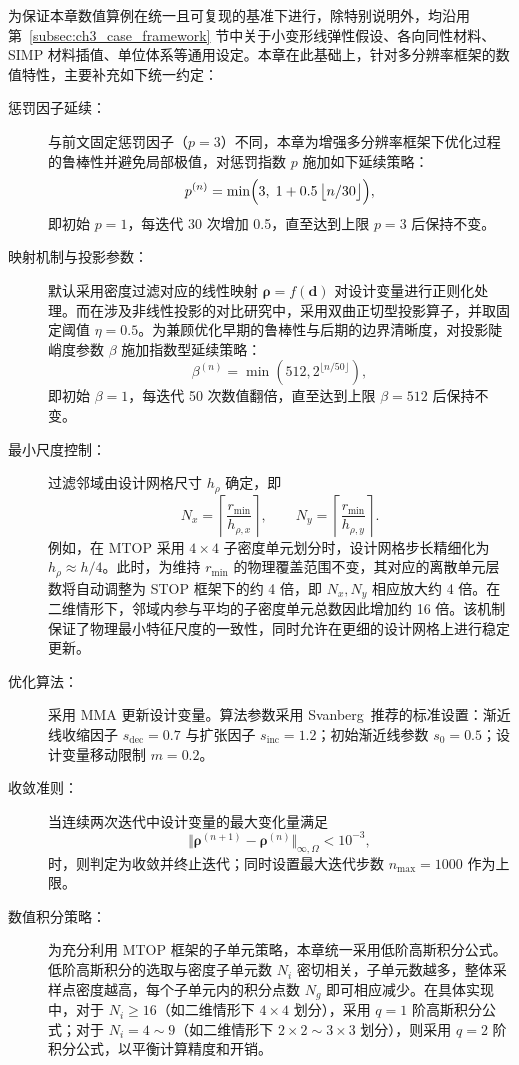 为保证本章数值算例在统一且可复现的基准下进行，除特别说明外，均沿用第~\ref{subsec:ch3_case_framework} 节中关于小变形线弹性假设、各向同性材料、SIMP 材料插值、单位体系等通用设定。本章在此基础上，针对多分辨率框架的数值特性，主要补充如下统一约定：
\begin{description}
	\item [惩罚因子延续：]与前文固定惩罚因子（$p=3$）不同，本章为增强多分辨率框架下优化过程的鲁棒性并避免局部极值，对惩罚指数 $p$ 施加如下延续策略：
	\[
	p^{(n)}=\min\Bigl(3,\; 1+0.5\,\bigl\lfloor n/30 \bigr\rfloor \Bigr),
	\]
	即初始 $p=1$，每迭代 30 次增加 0.5，直至达到上限 $p=3$ 后保持不变。
	
	\item [映射机制与投影参数：]默认采用密度过滤对应的线性映射 $\boldsymbol{\rho} = f(\boldsymbol{d})$ 对设计变量进行正则化处理。而在涉及非线性投影的对比研究中，采用双曲正切型投影算子，并取固定阈值 $\eta=0.5$。为兼顾优化早期的鲁棒性与后期的边界清晰度，对投影陡峭度参数 $\beta$ 施加指数型延续策略：
	\[
	\beta^{(n)} = \min\left(512, 2^{\lfloor n/50 \rfloor} \right),
	\]
	即初始 $\beta=1$，每迭代 50 次数值翻倍，直至达到上限 $\beta=512$ 后保持不变。
	
	\item [最小尺度控制：]过滤邻域由设计网格尺寸 $h_\rho$ 确定，即
	\[
	N_x=\left\lceil \frac{r_{\min}}{h_{\rho,x}} \right\rceil,\qquad  N_y=\left\lceil \frac{r_{\min}}{h_{\rho,y}} \right\rceil.
	\]
	例如，在 MTOP 采用 $4\times4$ 子密度单元划分时，设计网格步长精细化为 $h_\rho\approx h/4$。此时，为维持 $r_{\min}$ 的物理覆盖范围不变，其对应的离散单元层数将自动调整为 STOP 框架下的约 4 倍，即 $N_x,N_y$ 相应放大约 4 倍。在二维情形下，邻域内参与平均的子密度单元总数因此增加约 16 倍。该机制保证了物理最小特征尺度的一致性，同时允许在更细的设计网格上进行稳定更新。
	
	\item [优化算法：]采用 MMA 更新设计变量。算法参数采用 Svanberg~\cite{svanbergMmaGcmmaVersions2007a}推荐的标准设置：渐近线收缩因子 $s_{\text{dec}}=0.7$ 与扩张因子 $s_{\text{inc}}=1.2$；初始渐近线参数 $s_0=0.5$；设计变量移动限制 $m=0.2$。
	
	\item [收敛准则：]当连续两次迭代中设计变量的最大变化量满足
	\[
	\Vert\boldsymbol{\rho}^{(n+1)} - \boldsymbol{\rho}^{(n)}\Vert_{\infty,\Omega} < 10^{-3},
	\]
	时，则判定为收敛并终止迭代；同时设置最大迭代步数 $n_{\max}=1000$ 作为上限。
	
	\item [数值积分策略：]为充分利用 MTOP 框架的子单元策略，本章统一采用低阶高斯积分公式。低阶高斯积分的选取与密度子单元数 $N_i$ 密切相关，子单元数越多，整体采样点密度越高，每个子单元内的积分点数 $N_g$ 即可相应减少。在具体实现中，对于 $N_i\geq16$（如二维情形下 $4\times4$ 划分），采用 $q=1$ 阶高斯积分公式；对于 $N_i=4\sim9$（如二维情形下 $2\times2\sim3\times3$ 划分），则采用 $q=2$ 阶积分公式，以平衡计算精度和开销。
\end{description}


